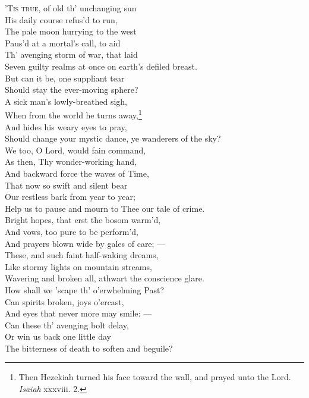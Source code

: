 ’\textsc{Tis true}, of old th’ unchanging sun \\
 His daily course refus’d to run, \\
 The pale moon hurrying to the west \\
 Paus’d at a mortal’s call, to aid \\
 Th’ avenging storm of war, that laid \\
 Seven guilty realms at once on earth’s defiled breast. \\
  But can it be, one suppliant tear \\
 Should stay the ever-moving sphere? \\
 A sick man’s lowly-breathed sigh, \\
 When from the world he turns away,\footnote{Then Hezekiah turned his face toward the wall, and prayed unto the Lord. \emph{Isaiah} xxxviii. 2.} \\
 And hides his weary eyes to pray, \\
 Should change your mystic dance, ye wanderers of the sky? \\
  We too, O Lord, would fain command, \\
 As then, Thy wonder-working hand, \\
 And backward force the waves of Time, \\
 That now so swift and silent bear \\
 Our restless bark from year to year; \\
 Help us to pause and mourn to Thee our tale of crime. \\
  Bright hopes, that erst the bosom warm’d, \\
 And vows, too pure to be perform’d, \\
 And prayers blown wide by gales of care; — \\
 These, and such faint half-waking dreams, \\
 Like stormy lights on mountain streams, \\
 Wavering and broken all, athwart the conscience glare. \\
  How shall we ’scape th’ o’erwhelming Past? \\
 Can spirits broken, joys o’ercast, \\
 And eyes that never more may smile: — \\
 Can these th’ avenging bolt delay, \\
 Or win us back one little day \\
 The bitterness of death to soften and beguile? \\
